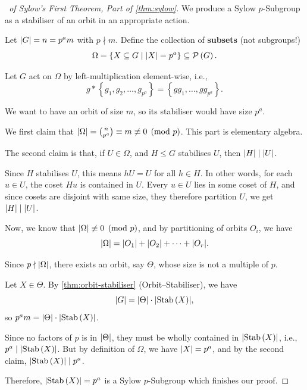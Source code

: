 \documentclass{article}
\theoremstyle{definition}
\theoremstyle{remark}
\DeclarePairedDelimiter{\abs}{\lvert}{\rvert}
\newcommand{\pqty}[1]{\left(#1\right)}
\newcommand{\Bqty}[1]{\left\{#1\right\}}
\newcommand{\set}[2]{\{#1\mid #2\}}
\newcommand{\subgroup}{\leq}
\newcommand{\divides}{\mid}
\newcommand{\notdivides}{\nmid}
\newcommand{\nequiv}{\not\equiv}
\newcommand{\powerset}{\mathcal{P}}
\newcommand{\Stab}{\operatorname{Stab}}
\begin{document}
\begin{proof}[\proofname\ of Sylow's First Theorem, Part of \autoref{thm:sylow}]
    We produce a Sylow \(p\)-Subgroup as a stabiliser of an orbit in an appropriate action.
    
    Let \(\abs{G} = n = p^a m\) with \(p \notdivides m\). Define the collection of \textbf{subsets} (not subgroups!)
    \[
        \Omega = \set{X \subseteq G}{\abs{X} = p^a} \subseteq \powerset\pqty{G}.
    \]

    Let \(G\) act on \(\Omega\) by left-multiplication element-wise, i.e.,
    \[
        g \ast \Bqty{g_1, g_2, \ldots, g_{p^a}} = \Bqty{g g_1, \ldots, g g_{p^a}}.
    \]

    We want to have an orbit of size \(m\), so its stabiliser would have size \(p^a\).

    We first claim that \(\abs{\Omega} = \binom{n}{p^a} \equiv m \nequiv 0 \pmod{p}\). This part is elementary algebra.

    The second claim is that, if \(U \in \Omega\), and \(H \subgroup G\) stabilises \(U\), then \(\abs{H} \divides \abs{U}\).
    
    Since \(H\) stabilises \(U\), this means \(hU = U\) for all \(h \in H\). In other words, for each \(u \in U\), the coset \(Hu\) is contained in \(U\). Every \(u \in U\) lies in some coset of \(H\), and since cosets are disjoint with same size, they therefore partition \(U\), we get \(\abs{H} \divides \abs{U}\).

    Now, we know that \(\abs{\Omega} \nequiv 0 \pmod{p}\), and by partitioning of orbits \(O_i\), we have
    \[
        \abs{\Omega} = \abs{O_1} + \abs{O_2} + \cdots + \abs{O_r}.
    \]

    Since \(p \notdivides \abs{\Omega}\), there exists an orbit, say \(\Theta\), whose size is not a multiple of \(p\).

    Let \(X \in \Theta\). By \autoref{thm:orbit-stabiliser} (Orbit--Stabiliser), we have
    \[
        \abs{G} = \abs{\Theta} \cdot \abs{\Stab\pqty{X}},
    \]
    so \(p^a m = \abs{\Theta} \cdot \abs{\Stab\pqty{X}}\).

    Since no factors of \(p\) is in \(\abs{\Theta}\), they must be wholly contained in \(\abs{\Stab\pqty{X}}\), i.e., \(p^a \divides \abs{\Stab\pqty{X}}\). But by definition of \(\Omega\), we have \(\abs{X} = p^a\), and by the second claim, \(\abs{\Stab\pqty{X}} \divides p^a\).

    Therefore, \(\abs{\Stab\pqty{X}} = p^a\) is a Sylow \(p\)-Subgroup which finishes our proof.
\end{proof}
\end{document}
